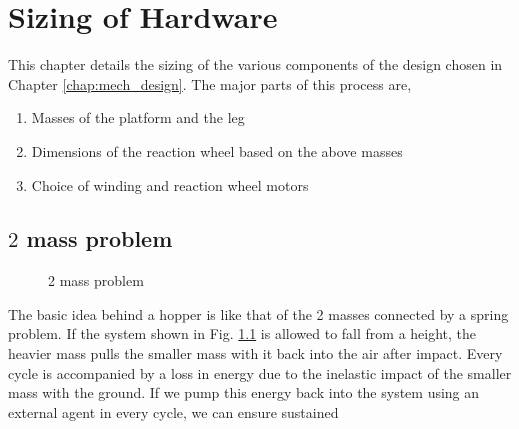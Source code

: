 \chapter{Sizing of Hardware}
\label{chap:sizing}
This chapter details the sizing of the various components of the design chosen in Chapter \ref{chap:mech_design}.
The major parts of this process are,
\begin{enumerate}
\item
Masses of the platform and the leg
\item
Dimensions of the reaction wheel based on the above masses
\item
Choice of winding and reaction wheel motors
\end{enumerate}

\section{$2$ mass problem}
\begin{figure}[!h]
\centering
{}
\caption{2 mass problem}
\label{fig:4_2mass}
\end{figure}
The basic idea behind a hopper is like that of the 2 masses connected by a spring problem. If the system shown in Fig.
\ref{fig:4_2mass} is allowed to fall from a height, the heavier mass pulls the smaller mass with it back into the air
after impact. Every cycle is accompanied by a loss in energy due to the inelastic impact of the smaller mass with the
ground. If we pump this energy back into the system using an external agent in every cycle, we can ensure sustained
